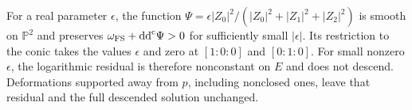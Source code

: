For a real parameter $\epsilon$, the function $\Psi=\epsilon|Z_0|^2/(|Z_0|^2+|Z_1|^2+|Z_2|^2)$ is smooth on $\mathbb P^2$ and preserves $\omega_{\mathrm{FS}}+\mathrm{dd}^{\mathrm{c}}\Psi>0$ for sufficiently small $|\epsilon|$. Its restriction to the conic takes the values $\epsilon$ and zero at $[1:0:0]$ and $[0:1:0]$. For small nonzero $\epsilon$, the logarithmic residual is therefore nonconstant on $E$ and does not descend. Deformations supported away from $p$, including nonclosed ones, leave that residual and the full descended solution unchanged.
